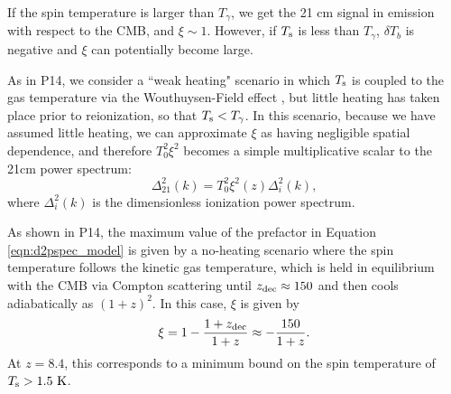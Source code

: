 \documentclass[twocolumn,numberedappendix]{emulateapj} \shorttitle{PSA64}
\newcommand{\Tspin}{T_{\rm s}}
\newcommand{\Tcmb}{T_\gamma}
\begin{document}
If the spin temperature is larger than $\Tcmb$, we get the 21 cm signal in
emission with respect to the CMB, and $\xi\sim1$. However, if $\Tspin$ is less than $\Tcmb$,
$\delta T_b$ is negative and $\xi$ can potentially become large.

As in P14,
we consider a ``weak heating" scenario in which $\Tspin$ is coupled to the gas temperature via
the Wouthuysen-Field effect \citep{wouthuysen1952,field1958,hirata2006},
but little heating has taken place prior to reionization, so that $\Tspin<\Tcmb$.
In this scenario, 
because we have assumed little heating, we can approximate $\xi$ as having negligible spatial
dependence, and therefore $T_0^2\xi^2$ becomes a simple multiplicative scalar to the 
21cm power spectrum:
\begin{equation}\label{eqn:d2pspec_model}
    \Delta^2_{21}(k) = T_0^2\xi^2(z)\Delta_{i}^{2}(k),%
\end{equation}
where $\Delta_{i}^{2}(k)$ is the dimensionless ionization power spectrum. 

As shown in P14, the maximum value of the
prefactor in Equation \eqref{eqn:d2pspec_model} is given by 
a no-heating scenario where the spin temperature follows the kinetic gas temperature,
which is held in equilibrium with the CMB via Compton scattering until $z_{\rm dec}\approx150$
\citep{furlanetto_et_al2006} and then cools adiabatically
as $(1+z)^2$.
In this case, $\xi$ is given by
\begin{equation}\label{eqn:maxxi}
\xi = 1 -\frac{1+z_{\rm dec}}{1+z} \approx -\frac{150}{1+z}.
\end{equation}
At $z=8.4$, this corresponds to a minimum bound on the spin temperature of $\Tspin>1.5~{\rm K}$.
\end{document}
